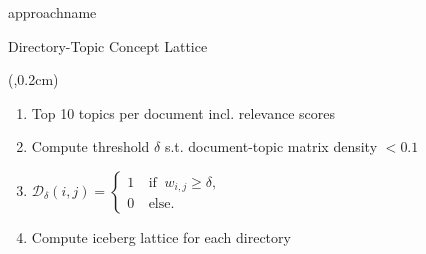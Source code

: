 \begin{frame}{\acs{approachname}}
    \begin{figure}
        
    \end{figure}
\end{frame}





\begin{frame}{Directory-Topic Concept Lattice}
    \begin{textblock*}{3.7cm}(\paperwidth-3.8cm,0.2cm) %
        \only<1>{
            
        }
    \end{textblock*}
    \begin{enumerate}
        \item <1,3-> Top 10 topics per document incl. relevance scores
        \item <3-> Compute threshold $\delta$ s.t. document-topic matrix density $< 0.1$
        \item <4-> $\mathcal{D}_\delta(i,j)=\left\{ \begin{array}{cl}
                        1 & \ \text{if } \ w_{i,j} \geq \delta, \\
                        0 & \ \text{else.}
                    \end{array} \right.$
        \item <5-> Compute iceberg lattice for each directory
    \end{enumerate}



\end{frame}
